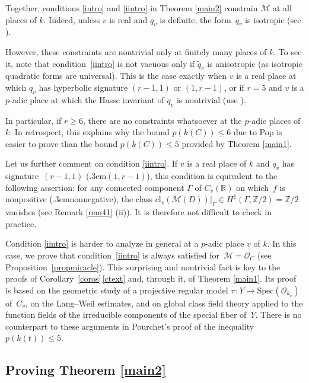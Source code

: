 \documentclass{amsart}
\theoremstyle{definition}
\theoremstyle{remark}
\numberwithin{equation}{section}
\newcommand{\cl}{\mathrm{cl}}
\newcommand{\Spec}{\mathrm{Spec}}
\def\resp {\text{resp.}\kern.3em}
\def\Z{\mathbb Z}
\def\R{\mathbb R}
\def\cM{\mathcal{M}}
\def\cO{\mathcal{O}}
\def\cM{\mathcal{M}}
\def\tq{\tilde{q}}
\begin{document}
Together, conditions \ref{intro} and \ref{iintro} in Theorem \ref{main2} constrain $\cM$ at all places of $k$.
Indeed, unless $v$ is real and $q_v$ is definite, the form~$q_v$ is isotropic (see \cite[VI.2.12]{Lam}).

However, these constraints are nontrivial only at finitely many places of $k$. To see it, note that condition~\ref{iintro} is not vacuous only if $\tq_v$ is anisotropic (as isotropic quadratic forms are universal).
This is the case exactly when $v$ is a real place at which $q_v$ has hyperbolic signature $(r-1,1)$ or $(1,r-1)$, or if $r=5$ and $v$ is a $p$-adic place at which the Hasse invariant of $q_v$ is nontrivial (use \cite[VI.2.12]{Lam}).

In particular, if $r\geq 6$, there are no constraints whatsoever at the $p$-adic places of $k$. In retrospect, this explains why the bound $p(k(C))\leq 6$ due to Pop is easier to prove than the bound $p(k(C))\leq 5$ provided by Theorem \ref{main1}.

\vspace{1em}
 
Let us further comment on condition \ref{iintro}.
If $v$ is a real place of $k$ and $q_v$ has signature~$(r-1,1)$ (\resp $(1,r-1)$), this condition is equivalent to the following assertion: for any connected component $\Gamma$ of $C_v(\R)$ on which~$f$ is nonpositive (\resp nonnegative), the class $\cl_v(\cM(D))|_{\Gamma}\in H^1(\Gamma,\Z/2)=\Z/2$ vanishes (see Remark \ref{rem41} (ii)). It is therefore not difficult to check in practice.

Condition \ref{iintro} is harder to analyze in general at a $p$-adic place $v$ of $k$. 
In this case, we prove that condition~\ref{iintro} is always satisfied for~${\cM=\cO_{C}}$ (see Proposition~\ref{propmiracle}). 
This surprising and nontrivial fact is key to the proofs of Corollary~\ref{coros}\,\ref{ctext} and, through it, of Theorem \ref{main1}.
Its proof is based on the geometric study of a projective regular model $\pi:Y\to\Spec(\cO_{k_v})$ of~$C_v$, on the Lang--Weil estimates, and on global class field theory applied to the function fields of the irreducible components of the special fiber of~$Y$.
There is no counterpart to these arguments in Pourchet's proof of the inequality $p(k(t))\leq 5$.


\subsection{Proving Theorem \ref{main2}}
\label{parsketch}
\end{document}
